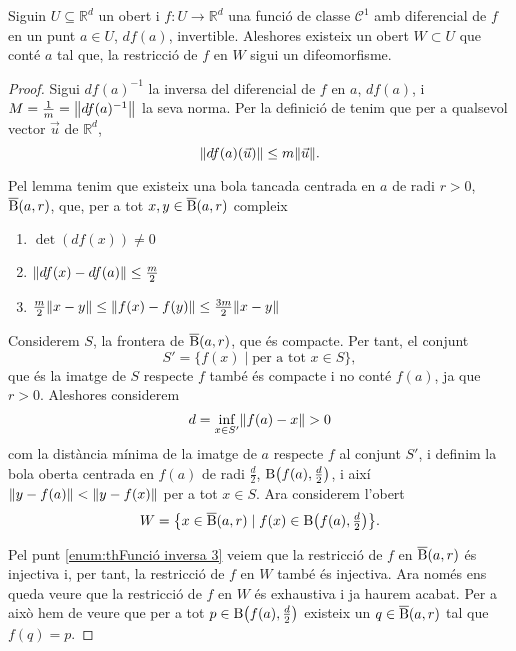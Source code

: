 \documentclass[../Apunts.tex]{subfiles}
\begin{document}
	\begin{theorem}
		\label{thm:Funció inversa}
		Siguin \(U\subseteq\mathbb{R}^{d}\) un obert i \(f\colon U\to\mathbb{R}^{d}\) una funció de classe \(\mathcal{C}^{1}\) amb diferencial de \(f\) en un punt \(a\in U\), \(df(a)\), invertible. Aleshores existeix un obert \(W\subset U\) que conté \(a\) tal que, la restricció de \(f\) en \(W\) sigui un difeomorfisme.
		\begin{proof}
			Sigui \(df(a)^{-1}\) la inversa del diferencial de \(f\) en \(a\), \(df(a)\), i \(M=\frac{1}{m}=\norm{df(a)^{-1}}\) la seva norma. Per la definició de  tenim que per a qualsevol vector \(\vec{u}\) de \(\mathbb{R}^{d}\),
			\[\norm{df(a)(\vec{u})}\leq m\norm{\vec{u}}.\]
			
			Pel lemma  tenim que existeix una bola tancada centrada en \(a\) de radi \(r>0\), \(\overline{\operatorname{B}}(a,r)\), que, per a tot \(x,y\in\overline{\operatorname{B}}(a,r)\) compleix
			\begin{enumerate}
				\item\label{enum:thFunció inversa 1} \(\det(df(x))\neq0\)
				\item\label{enum:thFunció inversa 2} \(\norm{df(x)-df(a)}\leq\frac{m}{2}\)
				\item\label{enum:thFunció inversa 3} \(\frac{m}{2}\norm{x-y} \leq\norm{f(x)-f(y)}\leq\frac{3m}{2}\norm{x-y}\)
			\end{enumerate}
			
			Considerem \(S\), la frontera de \(\overline{\operatorname{B}}(a,r)\), que és compacte. Per tant, el conjunt
			\[S'=\{f(x)\mid\text{per a tot }x\in S\},\]
			que és la imatge de \(S\) respecte \(f\) també és compacte i no conté \(f(a)\), ja que \(r>0\). Aleshores considerem
			\[d=\inf_{x\in S'}\norm{f(a)-x}>0\]
			com la distància mínima de la imatge de \(a\) respecte \(f\) al conjunt \(S'\), i definim la bola oberta centrada en \(f(a)\) de radi \(\frac{d}{2}\), \(\B\left(f(a),\tfrac{d}{2}\right)\), i així \(\norm{y-f(a)}<\norm{y-f(x)}\) per a tot \(x\in S\).
			Ara considerem l'obert
			\[W=\left\{x\in\overline{\B}(a,r)\mid f(x)\in\B\left(f(a),\tfrac{d}{2}\right)\right\}.\]
			
			Pel punt \eqref{enum:thFunció inversa 3} veiem que la restricció de \(f\) en \(\overline{\operatorname{B}}(a,r)\) és injectiva i, per tant, la restricció de \(f\) en \(W\) també és injectiva. Ara només ens queda veure que la restricció de \(f\) en \(W\) és exhaustiva i ja haurem acabat. Per a això hem de veure que per a tot \(p\in\B\left(f(a),\tfrac{d}{2}\right)\) existeix un \(q\in\overline{\operatorname{B}}(a,r)\) tal que \(f(q)=p\).
			

\end{proof}
\end{theorem}
\end{document}
